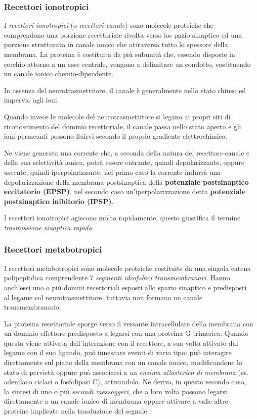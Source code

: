 \documentclass[]{article}
\begin{document}
\subsubsection{Recettori ionotropici}\label{recettori-ionotropici}

I \emph{recettori ionotropici} (o \emph{recettori-canale}) sono molecole
proteiche che comprendono una porzione recettoriale rivolta verso los
pazio sinaptico ed una porzione strutturata in canale ionico che
attraversa tutto lo spessore della membrana. La proteina è costituita da
più subunità che, essendo disposte in cerchio attorno a un asse
centrale, vengono a delimitare un condotto, costituendo un canale ionico
chemio-dipendente.

In assenza del neurotrasmettitore, il canale è generalmente nello stato
chiuso ed impervio agli ioni.

Quando invece le molecole del neurotrasmettitore si legano ai propri
siti di riconoscimento del dominio recettoriale, il canale passa nello
stato aperto e gli ioni permeanti possono fluirvi secondo il proprio
gradiente elettrochimico.

Ne viene generata una corrente che, a seconda della natura del
recettore-canale e della sua selettività ionica, potrà essere entrante,
quindi depolarizzante, oppure uscente, quindi iperpolarizzante: nel
primo caso la corrente indurrà una depolarizzazione della membrana
postsinaptica della \textbf{potenziale postsinaptico eccitatorio
(EPSP)}, nel secondo caso un'iperpolarizzazione detta \textbf{potenziale
postsinaptico inibitorio (IPSP)}.

I recettori ionotropici agiscono molto rapidamente, questo giustifica il
termine \emph{trasmissione sinaptica rapida}.

\subsubsection{Recettori metabotropici}\label{recettori-metabotropici}

I recettori metabotropici sono molecole proteiche costituite da una
singola catena polipeptidica comprendente 7 \emph{segmenti idrofobici
transmembranari}. Hanno anch'essi uno o più domini recettoriali esposti
allo spazio sinaptico e predisposti al legame col neurotrasmettitore,
tuttavia non formano un canale transmembranario.

La proteina recettoriale sporge verso il versante intracellulare della
membrana con un dominio effettore predisposto a legarsi con una proteina
G trimerica. Quando questa viene attivata dall'interazione con il
recettore, a sua volta attivato dal legame con il suo ligando, può
innescare eventi di vario tipo: può interagire direttamente sul piano
della membrana con un canale ionico, modificandone lo stato di pervietà
oppure può associarsi a un \emph{enzima allosterico di membrana} (es.
adenilaco ciclasi o fosfolipasi C), attivandolo. Ne deriva, in questo
secondo caso, la sintesi di uno o più \emph{secondi messaggeri}, che a
loro volta possono legarsi direttamente a un canale ionico di membrana
oppure attivare a valle altre proteine implicate nella trasduzione del
segnale.
\end{document}
